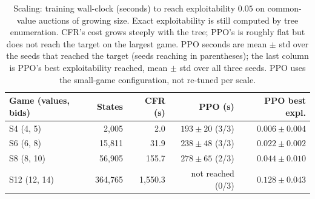 \documentclass[11pt,a4paper]{article}
\begin{document}
\begin{table}[t]
\centering
\caption{Scaling: training wall-clock (seconds) to reach exploitability $0.05$ on
common-value auctions of growing size. Exact exploitability is still computed by tree
enumeration. CFR's cost grows steeply with the tree; PPO's is roughly flat but does
not reach the target on the largest game. PPO seconds are mean $\pm$ std over the
seeds that reached the target (seeds reaching in parentheses); the last column is
PPO's best exploitability reached, mean $\pm$ std over all three seeds. PPO uses the
small-game configuration, not re-tuned per scale.}
\label{tab:scaling}
\small
\begin{tabular}{lrrrr}
\toprule
Game (values, bids) & States & CFR (s) & PPO (s) & PPO best expl. \\
\midrule
S4 (4, 5)   &   2{,}005 &     2.0 & $193 \pm 20$ (3/3) & $0.006 \pm 0.004$ \\
S6 (6, 8)   &  15{,}811 &    31.9 & $238 \pm 48$ (3/3) & $0.022 \pm 0.002$ \\
S8 (8, 10)  &  56{,}905 &   155.7 & $278 \pm 65$ (2/3) & $0.044 \pm 0.010$ \\
S12 (12, 14) & 364{,}765 & 1{,}550.3 & not reached (0/3) & $0.128 \pm 0.043$ \\
\bottomrule
\end{tabular}
\end{table}
\end{document}
